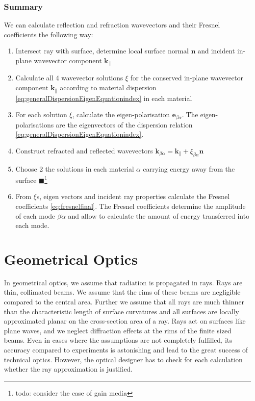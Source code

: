 \documentclass[12pt,a4paper,twoside,openright,BCOR10mm,headsepline,titlepage,abstracton,chapterprefix,final]{scrreprt}
\newcommand\Vector[1]{{\mathbf{#1}}}
\newcommand\wavenumber{k}
\newcommand\Wavevector{\Vector{\wavenumber}}
\newcommand{\remark}[1]{{\color{red}$\blacksquare$}\footnote{{\color{red}#1}}}
\begin{document}
\subsection{Summary}
We can calculate reflection and refraction wavevectors and their Fresnel coefficients the following way:
\begin{enumerate}
 \item Intersect ray with surface, determine local surface normal $\Vector{n}$ and incident in-plane wavevector component $\Wavevector_\parallel$
 \item Calculate all 4 wavevector solutions $\xi$ for the conserved in-plane wavevector component $\Wavevector_\parallel$ 
       according to material dispersion \eqref{eq:generalDispersionEigenEquationindex} in each material
 \item For each solution $\xi$, calculate the eigen-polarisation $\Vector{e}_{\beta\alpha}$.
       The eigen-polarisations are the eigenvectors of the dispersion relation \eqref{eq:generalDispersionEigenEquationindex}.
 \item Construct refracted and reflected wavevectors $\Wavevector_{\beta\alpha} = \Wavevector_\parallel + \xi_{\beta\alpha} \Vector{n}$
 \item Choose 2 the solutions in each material $\alpha$ carrying energy away from the surface
       \remark{todo: consider the case of gain media}
 \item From $\xi$s, eigen vectors and incident ray properties calculate the Fresnel coefficients \eqref{eq:fresnelfinal}.
       The Fresnel coefficients determine the amplitude of each mode $\beta\alpha$ 
       and allow to calculate the amount of energy transferred into each mode.
\end{enumerate}


\chapter{Geometrical Optics}
In geometrical optics, we assume that radiation is propagated in rays. Rays are thin, collimated beams. 
We assume that the rims of these beams are negligible compared to the central area. 
Further we assume that all rays are much thinner than the characteristic length of surface curvatures and 
all surfaces are locally approximated planar on the cross-section area of a ray.
Rays act on surfaces like plane waves, and we neglect diffraction effects at the rims of the finite sized beams.
Even in cases where the assumptions are not completely fulfilled, its accuracy compared to experiments is 
astonishing and lead to the great success of technical optics.
However, the optical designer has to check for each calculation whether the ray approximation is justified.
\end{document}
